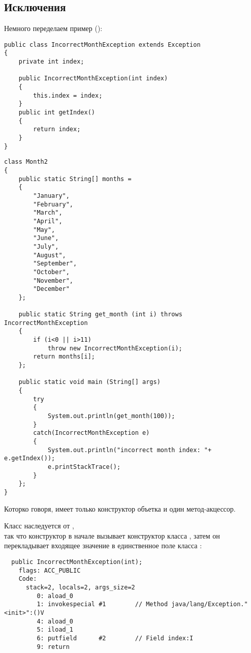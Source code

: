 \subsection{Исключения}

Немного переделаем пример  ():

\begin{lstlisting}[caption=IncorrectMonthException.java,style=customjava]
public class IncorrectMonthException extends Exception
{
	private int index;

	public IncorrectMonthException(int index)
	{
		this.index = index;
	} 
	public int getIndex()
	{
		return index;
	}
}
\end{lstlisting}

\begin{lstlisting}[caption=Month2.java,style=customjava]
class Month2
{
	public static String[] months = 
	{
		"January", 
		"February", 
		"March", 
		"April",
		"May",
		"June",
		"July",
		"August",
		"September",
		"October",
		"November",
		"December"
	};

	public static String get_month (int i) throws IncorrectMonthException
	{
		if (i<0 || i>11)
			throw new IncorrectMonthException(i);
		return months[i];
	};

	public static void main (String[] args)
	{
		try
		{
			System.out.println(get_month(100));
		}
		catch(IncorrectMonthException e)
		{
			System.out.println("incorrect month index: "+ e.getIndex());
			e.printStackTrace();
		}
	};
}
\end{lstlisting}

Которко говоря,  имеет только конструктор объетка и один
метод-акцессор.

Класс  наследуется от , \\
так что конструктор 
в начале вызывает конструктор класса , 
затем он перекладывает входящее значение в единственное поле класса :

\begin{lstlisting}
  public IncorrectMonthException(int);
    flags: ACC_PUBLIC
    Code:
      stack=2, locals=2, args_size=2
         0: aload_0       
         1: invokespecial #1        // Method java/lang/Exception."<init>":()V
         4: aload_0       
         5: iload_1       
         6: putfield      #2        // Field index:I
         9: return        
\end{lstlisting}

